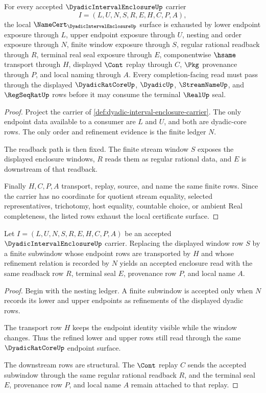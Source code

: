 \begin{theorem}
\label{thm:dyadic-interval-enclosure-namecert-obligations}
For every accepted $\DyadicIntervalEnclosureUp$ carrier
$$
I=(L,U,N,S,R,E,H,C,P,A),
$$
the local $\NameCert_{\DyadicIntervalEnclosureUp}$ surface is exhausted by lower endpoint exposure through $L$, upper endpoint exposure through $U$, nesting and order exposure through $N$, finite window exposure through $S$, regular rational readback through $R$, terminal real seal exposure through $E$, componentwise $\hsame$ transport through $H$, displayed $\Cont$ replay through $C$, $\Pkg$ provenance through $P$, and local naming through $A$. Every completion-facing read must pass through the displayed $\DyadicRatCoreUp$, $\DyadicUp$, $\StreamNameUp$, and $\RegSeqRatUp$ rows before it may consume the terminal $\RealUp$ seal.
\end{theorem}
\begin{proof}
Project the carrier of \autoref{def:dyadic-interval-enclosure-carrier}. The only endpoint data available to a consumer are $L$ and $U$, and both are dyadic-core rows. The only order and refinement evidence is the finite ledger $N$.

The readback path is then fixed. The finite stream window $S$ exposes the displayed enclosure windows, $R$ reads them as regular rational data, and $E$ is downstream of that readback.

Finally $H,C,P,A$ transport, replay, source, and name the same finite rows. Since the carrier has no coordinate for quotient stream equality, selected representatives, trichotomy, host equality, countable choice, or ambient Real completeness, the listed rows exhaust the local certificate surface.
\end{proof}

\begin{theorem}
\label{thm:dyadic-interval-enclosure-nesting-stability}
Let $I=(L,U,N,S,R,E,H,C,P,A)$ be an accepted $\DyadicIntervalEnclosureUp$ carrier. Replacing the displayed window row $S$ by a finite subwindow whose endpoint rows are transported by $H$ and whose refinement relation is recorded by $N$ yields an accepted enclosure read with the same readback row $R$, terminal seal $E$, provenance row $P$, and local name $A$.
\end{theorem}
\begin{proof}
Begin with the nesting ledger. A finite subwindow is accepted only when $N$ records its lower and upper endpoints as refinements of the displayed dyadic rows.

The transport row $H$ keeps the endpoint identity visible while the window changes. Thus the refined lower and upper rows still read through the same $\DyadicRatCoreUp$ endpoint surface.

The downstream rows are structural. The $\Cont$ replay $C$ sends the accepted subwindow through the same regular rational readback $R$, and the terminal seal $E$, provenance row $P$, and local name $A$ remain attached to that replay.
\end{proof}

